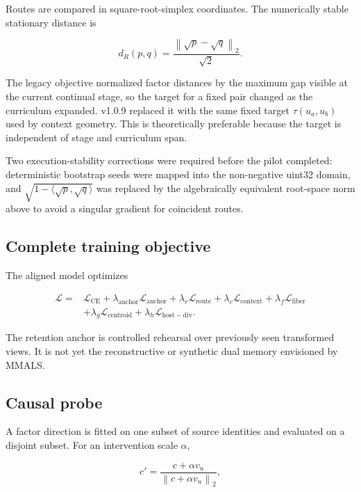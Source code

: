 \documentclass[11pt,a4paper]{article}
\newcommand{\loss}{\mathcal{L}}
\newcommand{\norm}[1]{\left\lVert #1 \right\rVert}
\begin{document}
Routes are compared in square-root-simplex coordinates. The numerically stable stationary distance is

\begin{equation}
 d_R(p,q)=\frac{\norm{\sqrt{p}-\sqrt{q}}_2}{\sqrt{2}}.
\end{equation}

The legacy objective normalized factor distances by the maximum gap visible at the current continual stage, so the target for a fixed pair changed as the curriculum expanded. v1.0.9 replaced it with the same fixed target $\tau(u_a,u_b)$ used by context geometry. This is theoretically preferable because the target is independent of stage and curriculum span.

Two execution-stability corrections were required before the pilot completed: deterministic bootstrap seeds were mapped into the non-negative uint32 domain, and $\sqrt{1-\langle\sqrt p,\sqrt q\rangle}$ was replaced by the algebraically equivalent root-space norm above to avoid a singular gradient for coincident routes.

\subsection{Complete training objective}

The aligned model optimizes

\begin{align}
\loss ={}& \loss_{\mathrm{CE}}
+\lambda_{\mathrm{anchor}}\loss_{\mathrm{anchor}}
+\lambda_r\loss_{\mathrm{route}}
+\lambda_c\loss_{\mathrm{context}}
+\lambda_f\loss_{\mathrm{fiber}} \\
&+\lambda_g\loss_{\mathrm{centroid}}
+\lambda_h\loss_{\mathrm{host-div}}.
\end{align}

The retention anchor is controlled rehearsal over previously seen transformed views. It is not yet the reconstructive or synthetic dual memory envisioned by MMALS.

\subsection{Causal probe}

A factor direction is fitted on one subset of source identities and evaluated on a disjoint subset. For an intervention scale $\alpha$,

\begin{equation}
 c' = \frac{c+\alpha v_u}{\norm{c+\alpha v_u}_2},
\end{equation}
\end{document}
